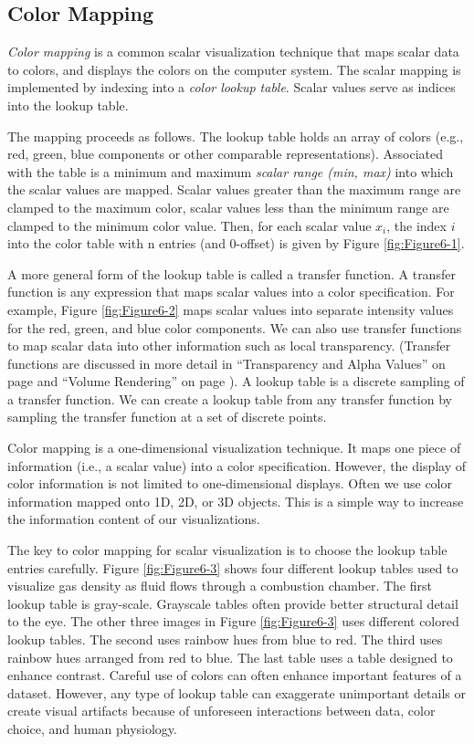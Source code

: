 \subsection{Color Mapping}
\label{subsec:color_mapping}

\emph{Color mapping} is a common scalar visualization technique that maps scalar data to colors, and displays the colors on the computer system. The scalar mapping is implemented by indexing into a \emph{color lookup table}. Scalar values serve as indices into the lookup table.

The mapping proceeds as follows. The lookup table holds an array of colors (e.g., red, green, blue components or other comparable representations). Associated with the table is a minimum and maximum \emph{scalar range (min, max)} into which the scalar values are mapped. Scalar values greater than the maximum range are clamped to the maximum color, scalar values less than the minimum range are clamped to the minimum color value. Then, for each scalar value $x_i$, the index $i$ into the color table with n entries (and 0-offset) is given by Figure \ref{fig:Figure6-1}.

A more general form of the lookup table is called a transfer function. A transfer function is any expression that maps scalar values into a color specification. For example, Figure \ref{fig:Figure6-2} maps scalar values into separate intensity values for the red, green, and blue color components. We can also use transfer functions to map scalar data into other information such as local transparency. (Transfer functions are discussed in more detail in ``Transparency and Alpha Values'' on page \pageref{sec:transparency_alpha} and ``Volume Rendering'' on page \pageref{sec:volume_rendering}).
A lookup table is a discrete sampling of a transfer function.
We can create a lookup table from any transfer function by sampling the transfer function at a set of discrete points.

Color mapping is a one-dimensional visualization technique. It maps one piece of information (i.e., a scalar value) into a color specification. However, the display of color information is not limited to one-dimensional displays. Often we use color information mapped onto 1D, 2D, or 3D objects. This is a simple way to increase the information content of our visualizations.

The key to color mapping for scalar visualization is to choose the lookup table entries carefully. Figure \ref{fig:Figure6-3} shows four different lookup tables used to visualize gas density as fluid flows through a combustion chamber. The first lookup table is gray-scale. Grayscale tables often provide better structural detail to the eye. The other three images in Figure \ref{fig:Figure6-3} uses different colored lookup tables. The second uses rainbow hues from blue to red. The third uses rainbow hues arranged from red to blue. The last table uses a table designed to enhance contrast. Careful use of colors can often enhance important features of a dataset. However, any type of lookup table can exaggerate unimportant details or create visual artifacts because of unforeseen interactions between data, color choice, and human physiology.

